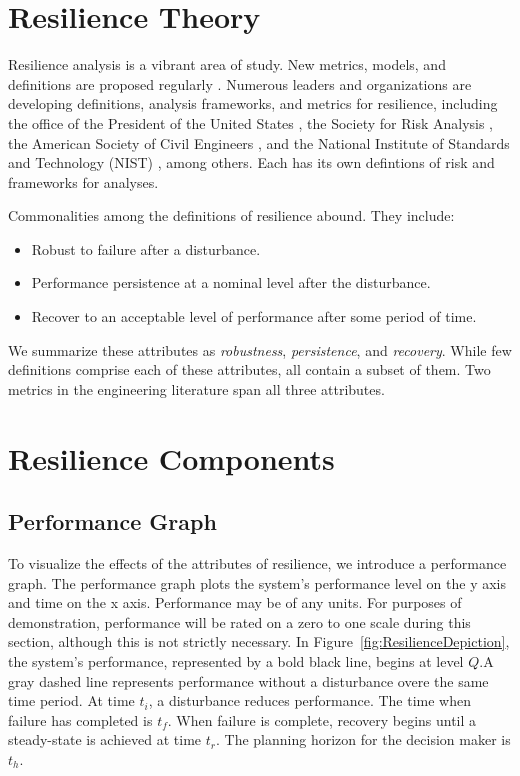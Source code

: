 \section{Resilience Theory}
Resilience analysis is a vibrant area of study. New metrics, models,
and definitions are proposed regularly \cite{Righi2015}
\cite{Hosseini2016}. Numerous leaders and organizations are developing
definitions, analysis frameworks, and metrics for resilience,
including the office of the President of the United States
\cite{PPD21}, the Society for Risk Analysis \cite{Aven2015b}, the
American Society of Civil Engineers \cite{IRD2016}, and the National
Institute of Standards and Technology (NIST) \cite{CRP2016}, among
others. Each has its own defintions of risk and frameworks for
analyses.

Commonalities among the definitions of resilience abound. They
include:
\begin{itemize}
  \item Robust to failure after a disturbance.
  \item Performance persistence at a nominal level after the
    disturbance.
  \item Recover to an acceptable level of performance after some
    period of time.
\end{itemize}
We summarize these attributes as \emph{robustness},
\emph{persistence}, and \emph{recovery}. While few definitions
comprise each of these attributes, all contain a subset of them. Two
metrics \cite{Ayyub2014a} \cite{Ayyub2015} \cite{Ouyang2012}
\cite{Ouyang2015} in the engineering literature span all three
attributes.

\section{Resilience Components}
\subsection{Performance Graph}
To visualize the effects of the attributes of resilience, we introduce
a performance graph. The performance graph plots the system's
performance level on the y axis and time on the x axis. Performance
may be of any units. For purposes of demonstration, performance will
be rated on a zero to one scale during this section, although this is
not strictly necessary. In Figure~\ref{fig:ResilienceDepiction}, the
system's performance, represented by a bold black line, begins at
level $Q$.A gray dashed line represents performance without a
disturbance overe the same time period. At time $t_i$, a disturbance
reduces performance. The time when failure has completed is
$t_f$. When failure is complete, recovery begins until a steady-state
is achieved at time $t_r$. The planning horizon for the decision maker
is $t_h$.

